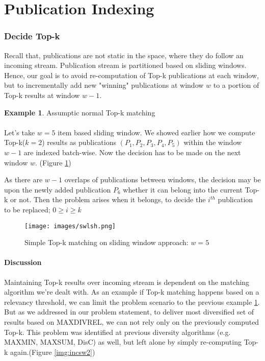 \documentclass[a4paper,12pt,oneside]{book}
\theoremstyle{definition}
\newtheorem{example}{Example}[section]
\theoremstyle{remark}
\begin{document}
\section{Publication Indexing}
\label{sec:pub_index}
\subsubsection{Decide Top-k}
Recall that, publications are not static in the space, where they do follow an incoming stream. Publication stream is partitioned based on sliding windows. Hence, our goal is to avoid re-computation of Top-k publications at each window, but to incrementally add new "winning" publications at window $w$ to a portion of Top-k results at window $w-1$.

\begin{example}{Assumptic normal Top-k matching}
\label{ex:asscase}
\paragraph*{}
Let's take $w=5$ item based sliding window. We showed earlier how we compute Top-k($k=2$) results as publications $(P_1,P_2,P_3,P_4,P_5)$ within the window $w-1$ are indexed batch-wise. Now the decision has to be made on the next window $w$. (Figure \ref{img:incsw1})

As there are $w-1$ overlaps of publications between windows, the decision may be upon the newly added publication $P_6$ whether it can belong into the current Top-k or not. Then the problem arises when it belongs, to decide the $i^{th}$ publication to be replaced; $0 \geq i \geq k$
\end{example}

\begin{figure}[h]
\begin{center}
\texttt{[image: images/swlsh.png]}
\caption{Simple Top-k matching on sliding window approach: $w = 5$}
\label{img:incsw1}
\end{center}
\end{figure}

\paragraph{Discussion}
Maintaining Top-k results over incoming stream is dependent on the matching algorithm we're dealt with. As an example if Top-k matching happens based on a relevancy threshold, we can limit the problem scenario to the previous example \ref{ex:asscase}. But as we addressed in our problem statement, to deliver most diversified set of results based on MAXDIVREL, we can not rely only on the previously computed Top-k. This problem was identified at previous diversity algorithms (e.g. MAXMIN, MAXSUM, DisC) as well, but left alone by simply re-computing Top-k again.(Figure \ref{img:incsw2})
\end{document}
